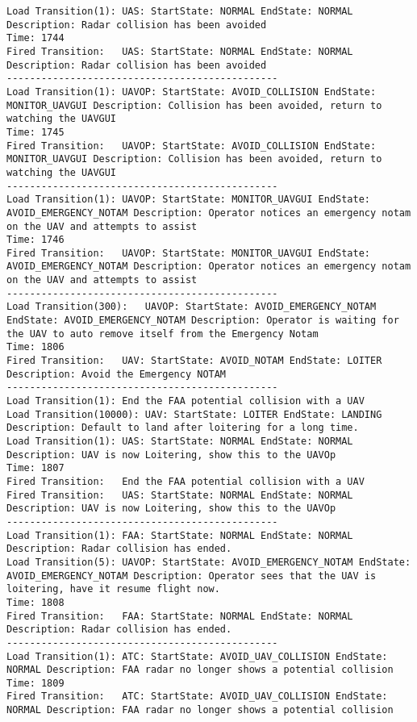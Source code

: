 \begin{spacing}{1}
\begin{verbatim}
Load Transition(1):	UAS: StartState: NORMAL EndState: NORMAL Description: Radar collision has been avoided
Time: 1744
Fired Transition:	UAS: StartState: NORMAL EndState: NORMAL Description: Radar collision has been avoided
-----------------------------------------------
Load Transition(1):	UAVOP: StartState: AVOID_COLLISION EndState: MONITOR_UAVGUI Description: Collision has been avoided, return to watching the UAVGUI
Time: 1745
Fired Transition:	UAVOP: StartState: AVOID_COLLISION EndState: MONITOR_UAVGUI Description: Collision has been avoided, return to watching the UAVGUI
-----------------------------------------------
Load Transition(1):	UAVOP: StartState: MONITOR_UAVGUI EndState: AVOID_EMERGENCY_NOTAM Description: Operator notices an emergency notam on the UAV and attempts to assist
Time: 1746
Fired Transition:	UAVOP: StartState: MONITOR_UAVGUI EndState: AVOID_EMERGENCY_NOTAM Description: Operator notices an emergency notam on the UAV and attempts to assist
-----------------------------------------------
Load Transition(300):	UAVOP: StartState: AVOID_EMERGENCY_NOTAM EndState: AVOID_EMERGENCY_NOTAM Description: Operator is waiting for the UAV to auto remove itself from the Emergency Notam
Time: 1806
Fired Transition:	UAV: StartState: AVOID_NOTAM EndState: LOITER Description: Avoid the Emergency NOTAM
-----------------------------------------------
Load Transition(1):	End the FAA potential collision with a UAV
Load Transition(10000):	UAV: StartState: LOITER EndState: LANDING Description: Default to land after loitering for a long time.
Load Transition(1):	UAS: StartState: NORMAL EndState: NORMAL Description: UAV is now Loitering, show this to the UAVOp
Time: 1807
Fired Transition:	End the FAA potential collision with a UAV
Fired Transition:	UAS: StartState: NORMAL EndState: NORMAL Description: UAV is now Loitering, show this to the UAVOp
-----------------------------------------------
Load Transition(1):	FAA: StartState: NORMAL EndState: NORMAL Description: Radar collision has ended.
Load Transition(5):	UAVOP: StartState: AVOID_EMERGENCY_NOTAM EndState: AVOID_EMERGENCY_NOTAM Description: Operator sees that the UAV is loitering, have it resume flight now.
Time: 1808
Fired Transition:	FAA: StartState: NORMAL EndState: NORMAL Description: Radar collision has ended.
-----------------------------------------------
Load Transition(1):	ATC: StartState: AVOID_UAV_COLLISION EndState: NORMAL Description: FAA radar no longer shows a potential collision
Time: 1809
Fired Transition:	ATC: StartState: AVOID_UAV_COLLISION EndState: NORMAL Description: FAA radar no longer shows a potential collision

\end{verbatim}
\end{spacing}
